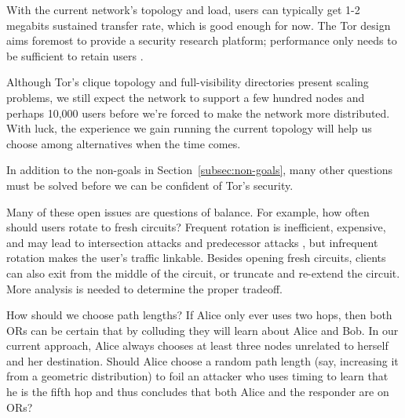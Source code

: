 \documentclass[times,10pt,twocolumn]{article}
\begin{document}

With the current network's topology and load, users can typically get 1-2
megabits sustained transfer rate, which is good enough for now. The Tor
design aims foremost to provide a security research platform; performance
only needs to be sufficient to retain users \cite{econymics,back01}.

Although Tor's clique topology and full-visibility directories present
scaling problems, we still expect the network to support a few hundred
nodes and perhaps 10,000 users before we're forced to make the network
more distributed. With luck, the experience we gain running the current
topology will help us choose among alternatives when the time comes.

\label{sec:maintaining-anonymity}

In addition to the non-goals in
Section~\ref{subsec:non-goals}, many other questions must be solved
before we can be confident of Tor's security.

Many of these open issues are questions of balance. For example,
how often should users rotate to fresh circuits? Frequent rotation
is inefficient, expensive, and may lead to intersection attacks and
predecessor attacks \cite{wright03}, but infrequent rotation makes the
user's traffic linkable. Besides opening fresh circuits, clients can
also exit from the middle of the circuit,
or truncate and re-extend the circuit. More analysis is
needed to determine the proper tradeoff.

%

How should we choose path lengths? If Alice only ever uses two hops,
then both ORs can be certain that by colluding they will learn about
Alice and Bob. In our current approach, Alice always chooses at least
three nodes unrelated to herself and her destination.
%
Should Alice choose a random path length (say,
increasing it from a geometric distribution) to foil an attacker who
uses timing to learn that he is the fifth hop and thus concludes that
both Alice and the responder are on ORs?
\end{document}
